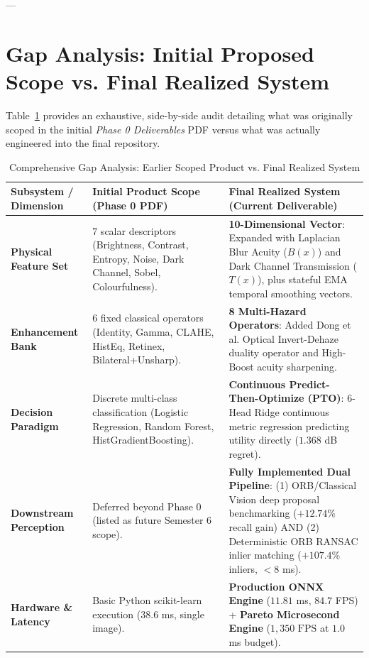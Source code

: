 \documentclass[10pt,a4paper]{article}
\begin{document}
---

\newpage
\section{Gap Analysis: Initial Proposed Scope vs. Final Realized System}

Table~\ref{tab:gap_analysis} provides an exhaustive, side-by-side audit detailing what was originally scoped in the initial \textit{Phase 0 Deliverables} PDF versus what was actually engineered into the final repository.

\begin{table}[htbp]
\centering
\small
\caption{Comprehensive Gap Analysis: Earlier Scoped Product vs. Final Realized System}
\label{tab:gap_analysis}
\begin{tabularx}{\textwidth}{p{3.2cm} p{5.5cm} X}
\toprule
\textbf{Subsystem / Dimension} & \textbf{Initial Product Scope (Phase 0 PDF)} & \textbf{Final Realized System (Current Deliverable)} \\
\midrule
\textbf{Physical Feature Set} & 
7 scalar descriptors (Brightness, Contrast, Entropy, Noise, Dark Channel, Sobel, Colourfulness). & 
\textbf{10-Dimensional Vector}: Expanded with Laplacian Blur Acuity ($B(x)$) and Dark Channel Transmission ($T(x)$), plus stateful EMA temporal smoothing vectors. \\
\addlinespace
\textbf{Enhancement Bank} & 
6 fixed classical operators (Identity, Gamma, CLAHE, HistEq, Retinex, Bilateral+Unsharp). & 
\textbf{8 Multi-Hazard Operators}: Added Dong et al. Optical Invert-Dehaze duality operator and High-Boost acuity sharpening. \\
\addlinespace
\textbf{Decision Paradigm} & 
Discrete multi-class classification (Logistic Regression, Random Forest, HistGradientBoosting). & 
\textbf{Continuous Predict-Then-Optimize (PTO)}: 6-Head Ridge continuous metric regression predicting utility directly ($1.368$ dB regret). \\
\addlinespace
\textbf{Downstream Perception} & 
Deferred beyond Phase 0 (listed as future Semester 6 scope). & 
\textbf{Fully Implemented Dual Pipeline}: (1) ORB/Classical Vision deep proposal benchmarking ($+12.74\%$ recall gain) AND (2) Deterministic ORB RANSAC inlier matching ($+107.4\%$ inliers, $<8$ ms). \\
\addlinespace
\textbf{Hardware \& Latency} & 
Basic Python scikit-learn execution ($38.6$ ms, single image). & 
\textbf{Production ONNX Engine} ($11.81$ ms, $84.7$ FPS) + \textbf{Pareto Microsecond Engine} ($1,350\text{ FPS}$ at $1.0$ ms budget). \\

\end{tabularx}
\end{table}
\end{document}
